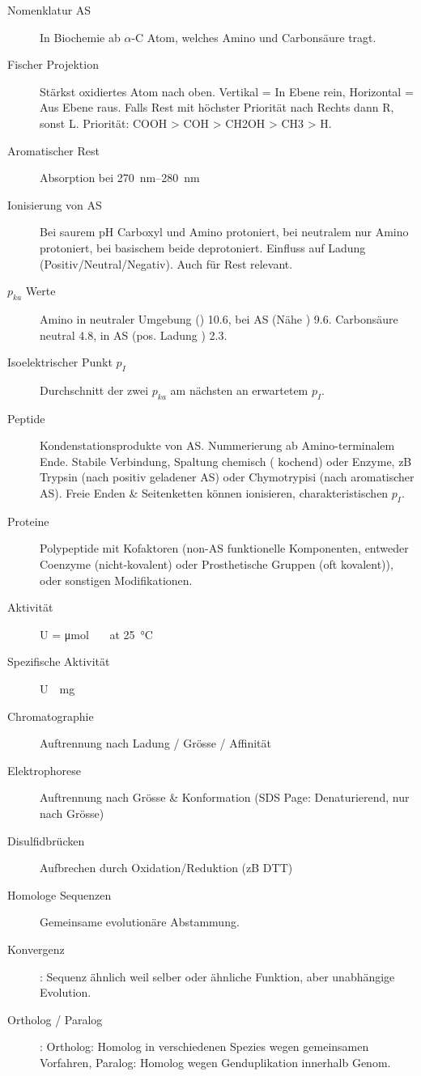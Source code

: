 \documentclass[a4paper,twocolumn,usegeometry,english,fontsize=6,DIV=16]{scrartcl}
\begin{document}
\begin{description}
	\item [Nomenklatur AS] In Biochemie ab $\alpha$-C Atom, welches Amino und Carbonsäure tragt.
	\item[Fischer Projektion] Stärkst oxidiertes Atom nach oben. Vertikal =
		In Ebene rein, Horizontal = Aus Ebene raus. Falls Rest mit
		höchster Priorität nach Rechts dann R, sonst L.  Priorität:
		COOH > COH > CH2OH > CH3 > H.
	\item[Aromatischer Rest] Absorption bei \SIrange{270}{280}{\nm}
	\item[Ionisierung von AS] Bei saurem pH Carboxyl und Amino protoniert,
		bei neutralem nur Amino protoniert, bei basischem beide
		deprotoniert. Einfluss auf Ladung (Positiv/Neutral/Negativ).
		Auch für Rest relevant.
	\item[$p_{ka}$ Werte] Amino in neutraler Umgebung () 10.6, bei
		AS (Nähe ) 9.6. Carbonsäure neutral 4.8, in AS (pos.
		Ladung ) 2.3.
	\item[Isoelektrischer Punkt $p_I$] Durchschnitt der zwei $p_{ka}$ am
		nächsten an erwartetem $p_I$.
	\item [Peptide] Kondenstationsprodukte von AS. Nummerierung ab
		Amino-terminalem Ende. Stabile Verbindung, Spaltung chemisch
		( kochend) oder Enzyme, zB Trypsin (nach positiv
		geladener AS) oder Chymotrypisi (nach aromatischer AS). Freie
		Enden \& Seitenketten können ionisieren, charakteristischen
		$p_I$.
	\item[Proteine] Polypeptide mit Kofaktoren (non-AS funktionelle
		Komponenten, entweder Coenzyme (nicht-kovalent) oder
		Prosthetische Gruppen (oft kovalent)), oder sonstigen
		Modifikationen.
	\item[Aktivität] \si{U} = \si{\micro \mole {} \per \min} at \SI{25}{\celsius}
	\item[Spezifische Aktivität] \si{U \per \mg {}}
	\item[Chromatographie] Auftrennung nach Ladung / Grösse / Affinität
	\item[Elektrophorese] Auftrennung nach Grösse \& Konformation (SDS
		Page: Denaturierend, nur nach Grösse)
	\item[Disulfidbrücken] Aufbrechen durch Oxidation/Reduktion (zB DTT)
	\item[Homologe Sequenzen] Gemeinsame evolutionäre Abstammung.
	\item[Konvergenz]: Sequenz ähnlich weil selber oder ähnliche Funktion, aber unabhängige Evolution.
	\item[Ortholog / Paralog]: Ortholog: Homolog in verschiedenen Spezies
		wegen gemeinsamen Vorfahren, Paralog: Homolog wegen
		Genduplikation innerhalb Genom.
\end{description}
\end{document}
